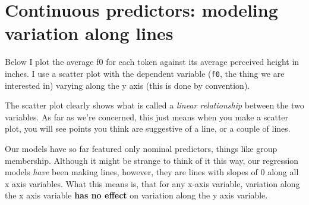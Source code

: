 \documentclass[
]{book}
\newenvironment{Shaded}{\begin{snugshade}}{\end{snugshade}}
\newcommand{\AttributeTok}[1]{\textcolor[rgb]{0.77,0.63,0.00}{#1}}
\newcommand{\CommentTok}[1]{\textcolor[rgb]{0.56,0.35,0.01}{\textit{#1}}}
\newcommand{\FunctionTok}[1]{\textcolor[rgb]{0.00,0.00,0.00}{#1}}
\newcommand{\NormalTok}[1]{#1}
\newcommand{\OtherTok}[1]{\textcolor[rgb]{0.56,0.35,0.01}{#1}}
\newcommand{\SpecialCharTok}[1]{\textcolor[rgb]{0.00,0.00,0.00}{#1}}
\newcommand{\StringTok}[1]{\textcolor[rgb]{0.31,0.60,0.02}{#1}}
\begin{document}
\begin{Shaded}
\end{Shaded}

\hypertarget{continuous-predictors-modeling-variation-along-lines}{%
\section{Continuous predictors: modeling variation along lines}\label{continuous-predictors-modeling-variation-along-lines}}

Below I plot the average f0 for each token against its average perceived height in inches. I use a scatter plot with the dependent variable (\texttt{f0}, the thing we are interested in) varying along the y axis (this is done by convention).

The scatter plot clearly shows what is called a \emph{linear relationship} between the two variables. As far as we're concerned, this just means when you make a scatter plot, you will see points you think are suggestive of a line, or a couple of lines.

Our models have so far featured only nominal predictors, things like group membership. Although it might be strange to think of it this way, our regression models \emph{have} been making lines, however, they are lines with slopes of 0 along all x axis variables. What this means is, that for any x-axis variable, variation along the x axis variable \textbf{has no effect} on variation along the y axis variable.
\end{document}
